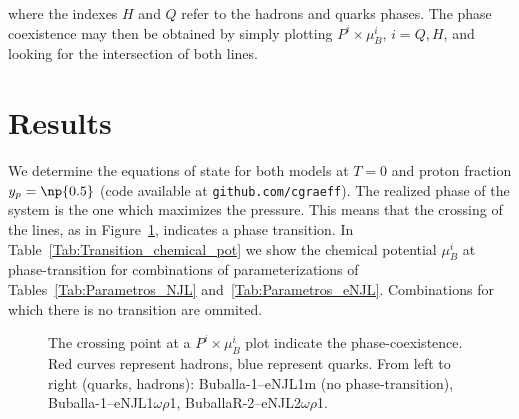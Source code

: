 \documentclass[plainsections,a0]{sciposterlocal}
\begin{document}
\begin{multicols}{2}
\noindent{}where the indexes $H$ and $Q$ refer to the hadrons and quarks phases. The phase coexistence may then be obtained by simply plotting $P^i \times \mu_B^i$, $i = Q, H$, and looking for the intersection of both lines.

\section*{Results}

We determine the equations of state for both models at $T = 0$ and proton fraction $y_p = \np{0.5}$ (code available at \texttt{github.com/cgraeff}). The realized phase of the system is the one which maximizes the pressure. This means that the crossing of the lines, as in Figure~\ref{Fig:Pressure_func_chemical_pot}, indicates a phase transition.
%
In Table~\ref{Tab:Transition_chemical_pot} we show the chemical potential $\mu_B^i$ at phase-transition for combinations of parameterizations of Tables~\ref{Tab:Parametros_NJL} and~\ref{Tab:Parametros_eNJL}. Combinations for which there is no transition are ommited.

\begin{figure}
\caption{The crossing point at a $P^i \times \mu_B^i$ plot indicate the phase-coexistence. Red curves represent hadrons, blue represent quarks. From left to right (quarks, hadrons): Buballa-1--eNJL1m (no phase-transition), Buballa-1--eNJL1$\omega\rho$1, BuballaR-2--eNJL2$\omega\rho$1.\label{Fig:Pressure_func_chemical_pot}}

\end{figure}


\end{multicols}
\end{document}
